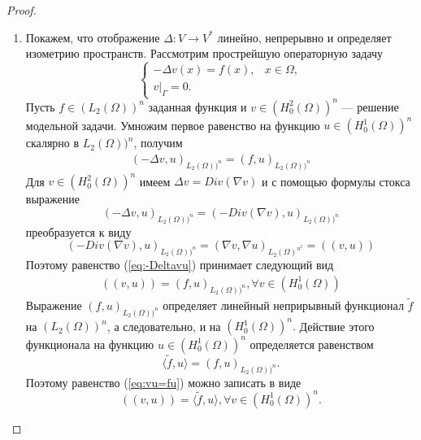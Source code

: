 \begin{proof} ~\\
    \begin{enumerate} 
        \item Покажем, что отображение $\Delta: V \rightarrow V^\ast$ линейно, непрерывно и определяет изометрию пространств.
        Рассмотрим прострейшую операторную задачу 
        $$
        \begin{cases}
            -\Delta v(x)=f(x), & x\in\Omega,\\
            v|_{\Gamma}=0.
        \end{cases}
        $$
        Пусть $f\in(L_2(\Omega))^n$ заданная функция и $v\in (H_0^2(\Omega))^n$ --- решение модельной задачи. Умножим первое равенство на функцию $u\in (H_0^1(\Omega))^n$ 
        скалярно в $L_2(\Omega))^n$, получим
        \begin{equation}\label{eq:-Deltavu}
            \begin{gathered}
                (-\Delta v,u)_{L_2(\Omega))^n}=(f,u)_{L_2(\Omega))^n}
            \end{gathered}
        \end{equation}
        Для $v\in (H_0^2(\Omega))^n$ имеем $\Delta v= Div (\nabla v)$ и с помощью формулы стокса выражение $$(-\Delta v,u)_{L_2(\Omega))^n}=(-Div (\nabla v),u)_{L_2(\Omega))^n}$$ преобразуется к виду
        $$(-Div (\nabla v),u)_{L_2(\Omega))^n}=(\nabla v,\nabla u)_{L_2(\Omega)^{n^2}}=((v,u))$$
        Поэтому равенство (\ref{eq:-Deltavu}) принимает следующий вид
        \begin{equation}\label{eq:vu=fu}
            \begin{gathered}
                ((v,u))=(f,u)_{L_2(\Omega))^n}, \forall v\in (H_0^1(\Omega))
            \end{gathered}
        \end{equation}
        Выражение $(f,u)_{L_2(\Omega))^n}$ определяет линейный неприрывный функционал $\tilde f$ на $(L_2(\Omega))^n$, а следовательно, и на $(H_0^1(\Omega))^n.$
        Действие этого функционала на функцию $u\in (H_0^1(\Omega))^n$ определяется равенством $$\langle\tilde f,u \rangle = (f,u)_{L_2(\Omega))^n}.$$
        Поэтому равенство (\ref{eq:vu=fu}) можно записать в виде $$((v,u))=\langle\tilde f,u \rangle, \forall v\in (H_0^1(\Omega))^n.$$


\end{enumerate}
\end{proof}
